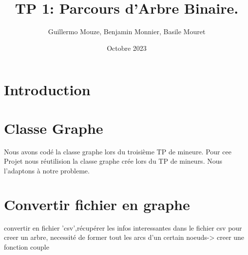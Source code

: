 \documentclass{article}
\title{TP 1: Parcours d'Arbre Binaire.}
\author{Guillermo Mouze, Benjamin Monnier, Basile Mouret}
\date{Octobre 2023}
\begin{document}
\maketitle
\tableofcontents{}

\section{Introduction}

\section{Classe Graphe}
Nous avons codé la classe graphe lors du troisième TP de mineure.
Pour cee Projet nous réutilision la classe graphe crée lors du TP de mineurs. Nous l'adaptons à
notre probleme.


\section{Convertir fichier  en graphe}
convertir en fichier 'csv',récupérer les infos interessantes dans le fichier csv pour creer un arbre, 
necessité de former tout les arcs d'un certain noeuds-> creer une fonction couple
\end{document}
